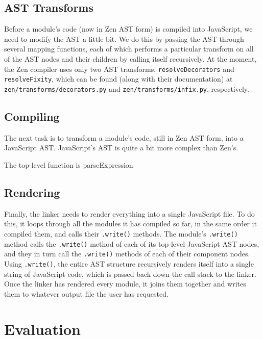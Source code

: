 \documentclass{article}
\begin{document}
\subsection{AST Transforms}
Before a module's code (now in Zen AST form) is compiled into JavaScript, we need to modify the AST a little bit. We do this by passing the AST through several mapping functions, each of which performs a particular transform on all of the AST nodes and their children by calling itself recursively. At the moment, the Zen compiler uses only two AST transforms, \lstinline{resolveDecorators} and \lstinline{resolveFixity}, which can be found (along with their documentation) at \lstinline{zen/transforms/decorators.py} and \lstinline{zen/transforms/infix.py}, respectively.

\subsection{Compiling}
The next task is to transform a module's code, still in Zen AST form, into a JavaScript AST. JavaScript's AST is quite a bit more complex than Zen's.

The top-level function is parseExpression


\subsection{Rendering}
Finally, the linker needs to render everything into a single JavaScript file. To do this, it loops through all the modules it has compiled so far, in the same order it compiled them, and calls their \lstinline{.write()} methods. The module's \lstinline{.write()} method calls the \lstinline{.write()} method of each of its top-level JavaScript AST nodes, and they in turn call the \lstinline{.write()} methods of each of their component nodes. Using \lstinline{.write()}, the entire AST structure recursively renders itself into a single string of JavaScript code, which is passed back down the call stack to the linker. Once the linker has rendered every module, it joins them together and writes them to whatever output file the user has requested.



\section{Evaluation}
\end{document}
